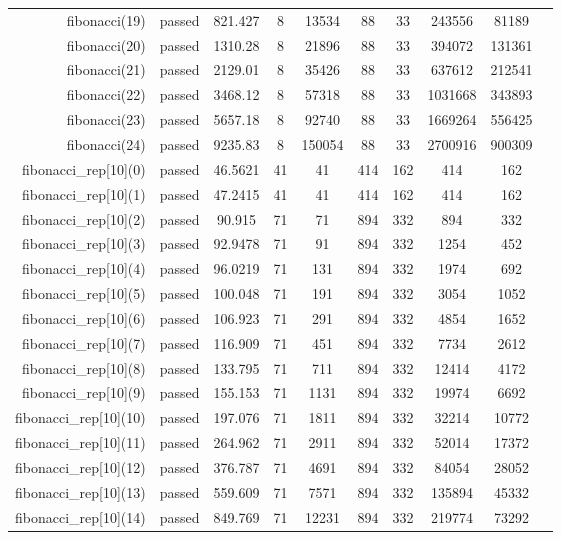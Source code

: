 \begin{longtable}{r|ccccccccc}
    fibonacci(19) & passed & 821.427 & 8 & 13534 & 88 & 33 & 243556 & 81189 \\
    fibonacci(20) & passed & 1310.28 & 8 & 21896 & 88 & 33 & 394072 & 131361 \\
    fibonacci(21) & passed & 2129.01 & 8 & 35426 & 88 & 33 & 637612 & 212541 \\
    fibonacci(22) & passed & 3468.12 & 8 & 57318 & 88 & 33 & 1031668 & 343893 \\
    fibonacci(23) & passed & 5657.18 & 8 & 92740 & 88 & 33 & 1669264 & 556425 \\
    fibonacci(24) & passed & 9235.83 & 8 & 150054 & 88 & 33 & 2700916 & 900309 \\
    fibonacci\_rep[10](0) & passed & 46.5621 & 41 & 41 & 414 & 162 & 414 & 162 \\
    fibonacci\_rep[10](1) & passed & 47.2415 & 41 & 41 & 414 & 162 & 414 & 162 \\
    fibonacci\_rep[10](2) & passed & 90.915 & 71 & 71 & 894 & 332 & 894 & 332 \\
    fibonacci\_rep[10](3) & passed & 92.9478 & 71 & 91 & 894 & 332 & 1254 & 452 \\
    fibonacci\_rep[10](4) & passed & 96.0219 & 71 & 131 & 894 & 332 & 1974 & 692 \\
    fibonacci\_rep[10](5) & passed & 100.048 & 71 & 191 & 894 & 332 & 3054 & 1052 \\
    fibonacci\_rep[10](6) & passed & 106.923 & 71 & 291 & 894 & 332 & 4854 & 1652 \\
    fibonacci\_rep[10](7) & passed & 116.909 & 71 & 451 & 894 & 332 & 7734 & 2612 \\
    fibonacci\_rep[10](8) & passed & 133.795 & 71 & 711 & 894 & 332 & 12414 & 4172 \\
    fibonacci\_rep[10](9) & passed & 155.153 & 71 & 1131 & 894 & 332 & 19974 & 6692 \\
    fibonacci\_rep[10](10) & passed & 197.076 & 71 & 1811 & 894 & 332 & 32214 & 10772 \\
    fibonacci\_rep[10](11) & passed & 264.962 & 71 & 2911 & 894 & 332 & 52014 & 17372 \\
    fibonacci\_rep[10](12) & passed & 376.787 & 71 & 4691 & 894 & 332 & 84054 & 28052 \\
    fibonacci\_rep[10](13) & passed & 559.609 & 71 & 7571 & 894 & 332 & 135894 & 45332 \\
    fibonacci\_rep[10](14) & passed & 849.769 & 71 & 12231 & 894 & 332 & 219774 & 73292 \\

\end{longtable}
